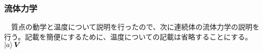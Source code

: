 \subsubsection{流体力学}
　質点の動学と温度について説明を行ったので、次に連続体の流体力学の説明を行う。記載を簡便にするために、温度についての記載は省略することにする。$\ket{a}\bm{V}$